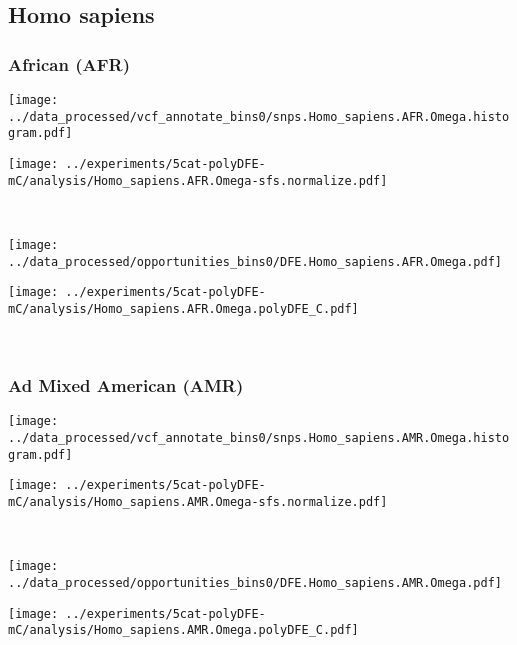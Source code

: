 \subsection{Homo sapiens}

\subsubsection{African (AFR)}

\begin{minipage}{0.49\linewidth}
    \texttt{[image: ../data\_processed/vcf\_annotate\_bins0/snps.Homo\_sapiens.AFR.Omega.histogram.pdf]}
\end{minipage}
\begin{minipage}{0.49\linewidth}
    \texttt{[image: ../experiments/5cat-polyDFE-mC/analysis/Homo\_sapiens.AFR.Omega-sfs.normalize.pdf]}
\end{minipage}
\\
\begin{minipage}{0.49\linewidth}
    \texttt{[image: ../data\_processed/opportunities\_bins0/DFE.Homo\_sapiens.AFR.Omega.pdf]}
\end{minipage}
\begin{minipage}{0.49\linewidth}
    \texttt{[image: ../experiments/5cat-polyDFE-mC/analysis/Homo\_sapiens.AFR.Omega.polyDFE\_C.pdf]}
\end{minipage}
\\

\subsubsection{Ad Mixed American (AMR)}

\begin{minipage}{0.49\linewidth}
    \texttt{[image: ../data\_processed/vcf\_annotate\_bins0/snps.Homo\_sapiens.AMR.Omega.histogram.pdf]}
\end{minipage}
\begin{minipage}{0.49\linewidth}
    \texttt{[image: ../experiments/5cat-polyDFE-mC/analysis/Homo\_sapiens.AMR.Omega-sfs.normalize.pdf]}
\end{minipage}
\\
\begin{minipage}{0.49\linewidth}
    \texttt{[image: ../data\_processed/opportunities\_bins0/DFE.Homo\_sapiens.AMR.Omega.pdf]}
\end{minipage}
\begin{minipage}{0.49\linewidth}
    \texttt{[image: ../experiments/5cat-polyDFE-mC/analysis/Homo\_sapiens.AMR.Omega.polyDFE\_C.pdf]}
\end{minipage}
\\

